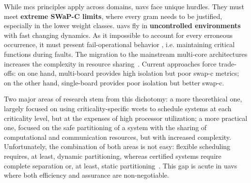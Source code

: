 While \gls{mcs} principles apply across domains, \glspl{uav} face unique hurdles. They
must meet
\textbf{extreme SWaP-C limits}, where every gram needs to be justified,
especially in the lower weight classes. \glspl{uav} fly in \textbf{uncontrolled
  environments} with fast changing dynamics. As it impossible to account for
every erroneous occurrence, it must present fail-operational behavior , i.e. maintaining critical functions during faults. The
migration to the mainstream multi-core architectures increases the complexity in
resource sharing~\cite{burns2022mixed}.
Current approaches force trade-offs: on one hand, multi-board provides high
isolation but poor \gls{swap-c} metrics; on the other hand, single-board
provides poor isolation but better \gls{swap-c}.



Two major areas of research stem from this dichotomy: a more theorethical one,
largely focused on using criticality-specific \glspl{wcet} to schedule systems
at each criticality level, but at the expenses of high processor utilization; a
more practical one, focused on the safe partitioning of a system with the
sharing of computational and communication resources, but with increased
complexity.
Unfortunately, the combination of both areas is not easy: flexible scheduling
requires, at least, dynamic partitioning, whereas certified systems require
complete separation or, at least, static partitioning~\cite{burns2022mixed}.
This gap is acute in \glspl{uav} where both efficiency and assurance are non-negotiable.

